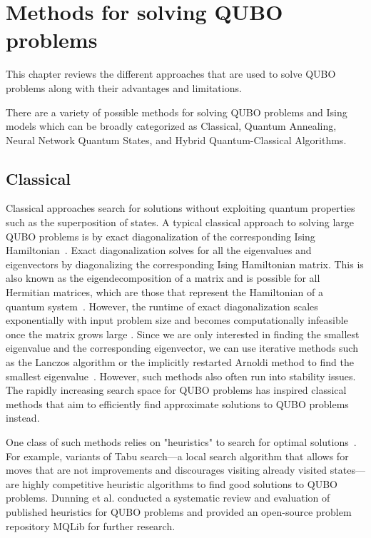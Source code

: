 \chapter{Methods for solving QUBO problems}
This chapter reviews the different approaches that are used to solve QUBO problems along with their advantages and limitations.

\label{review}
\vspace{2em}
There are a variety of possible methods for solving QUBO problems and Ising models which can be broadly categorized as Classical, Quantum Annealing, Neural Network Quantum States, and Hybrid Quantum-Classical Algorithms.

\section{Classical}
Classical approaches search for solutions without exploiting quantum properties such as the superposition of states. A typical classical approach to solving large QUBO problems is by exact diagonalization of the corresponding Ising Hamiltonian~\cite{b25}. Exact diagonalization solves for all the eigenvalues and eigenvectors by diagonalizing the corresponding Ising Hamiltonian matrix. This is also known as the eigendecomposition of a matrix and is possible for all Hermitian matrices, which are those that represent the Hamiltonian of a quantum system~\cite{b27}. However, the runtime of exact diagonalization scales exponentially with input problem size and becomes computationally infeasible once the matrix grows large \cite{b25}. Since we are only interested in finding the smallest eigenvalue and the corresponding eigenvector, we can use iterative methods such as the Lanczos algorithm or the implicitly restarted Arnoldi method to find the smallest eigenvalue~\cite{b28,b29}. However, such methods also often run into stability issues. The rapidly increasing search space for QUBO problems has inspired classical methods that aim to efficiently find approximate solutions to QUBO problems instead.

One class of such methods relies on "heuristics" to search for optimal solutions~\cite{b12}. For example, variants of Tabu search---a local search algorithm that allows for moves that are not improvements and discourages visiting already visited states---are highly competitive heuristic algorithms to find good solutions to QUBO problems\cite{b2,b30}. Dunning et al. conducted a systematic review and evaluation of published heuristics for QUBO problems and provided an open-source problem repository MQLib for further research. 

